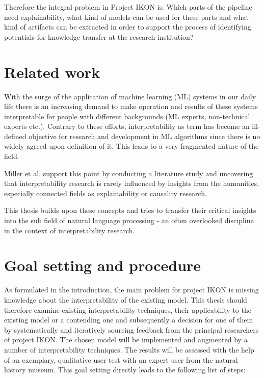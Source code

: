 \documentclass[pdftex,a4paper,12pt]{scrartcl}
\begin{document}
Therefore the integral problem in Project IKON is: Which parts of the pipeline need explainability, what kind of models can be used for these parts and what kind of artifacts can be extracted in order to support the process of identifying potentials for knowledge transfer at the research institution?

\section{Related work}

With the surge of the application of machine learning (ML) systems in our daily life there is an increasing demand to make operation and results of these systems interpretable for people with different backgrounds (ML experts, non-technical experts etc.). Contrary to these efforts, interpretability as term has become an ill-defined objective \cite{liptonMythosModelInterpretability2016}  for research and development in ML algorithms since there is no widely agreed upon definition of it. This leads to a very fragmented nature of the field. 

Miller et al. \cite{millerExplainableAIBeware2017} support this point by conducting a literature study and uncovering that interpretability research is rarely influenced by insights from the humanities, especially connected fields as explainability or causality research.

This thesis builds upon these concepts  and tries to transfer their critical insights into the sub field of natural language processing - an often overlooked discipline in the context of interpretability research.

\section{Goal setting and procedure} 
As formulated in the introduction, the main problem for project IKON is missing knowledge about the interpretability of the existing model. This thesis should therefore examine existing interpretability techniques, their applicability to the existing model or a contending one and subsequently a decision for one of them by systematically and iteratively sourcing feedback from the principal researchers of project IKON. The chosen model will be implemented and augmented by a number of interpretability techniques. The results will be assessed with the help of an exemplary, qualitative user test with an expert user from the natural history museum. This goal setting directly leads to the following list of steps:
\end{document}
